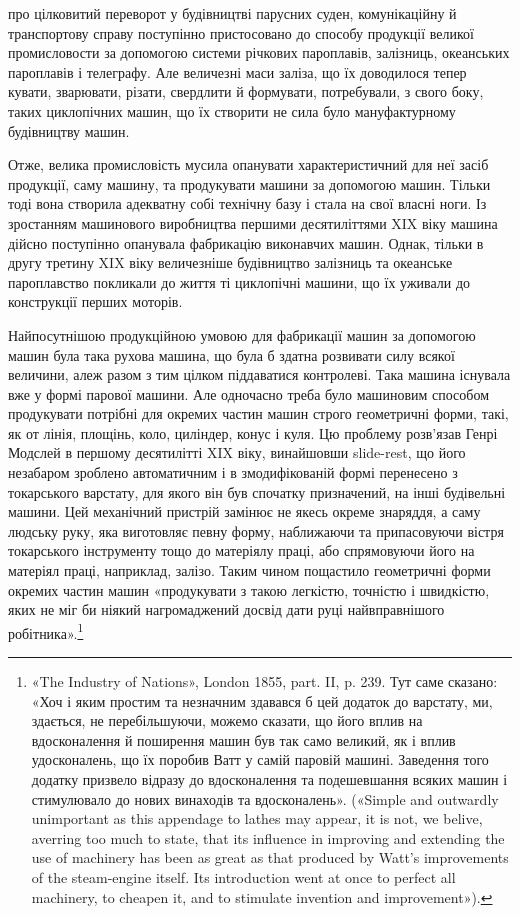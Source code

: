 про цілковитий переворот у будівництві парусних суден, комунікаційну
й транспортову справу поступінно пристосовано до способу
продукції великої промисловости за допомогою системи річкових
пароплавів, залізниць, океанських пароплавів і телеграфу.
Але величезні маси заліза, що їх доводилося тепер кувати, зварювати,
різати, свердлити й формувати, потребували, з свого боку,
таких циклопічних машин, що їх створити не сила було мануфактурному
будівництву машин.

Отже, велика промисловість мусила опанувати характеристичний
для неї засіб продукції, саму машину, та продукувати машини
за допомогою машин. Тільки тоді вона створила адекватну собі
технічну базу і стала на свої власні ноги. Із зростанням машинового
виробництва першими десятиліттями XIX віку машина дійсно
поступінно опанувала фабрикацію виконавчих машин. Однак,
тільки в другу третину XIX віку величезніше будівництво
залізниць та океанське пароплавство покликали до життя ті
циклопічні машини, що їх уживали до конструкції перших
моторів.

Найпосутнішою продукційною умовою для фабрикації машин
за допомогою машин була така рухова машина, що була б здатна
розвивати силу всякої величини, алеж разом з тим цілком піддаватися
контролеві. Така машина існувала вже у формі парової
машини. Але одночасно треба було машиновим способом продукувати
потрібні для окремих частин машин строго геометричні
форми, такі, як от лінія, площінь, коло, циліндер, конус і куля.
Цю проблему розв’язав Генрі Модслей в першому десятилітті
XIX віку, винайшовши slide-rest, що його незабаром зроблено
автоматичним і в змодифікованій формі перенесено з токарського
варстату, для якого він був спочатку призначений, на інші будівельні
машини. Цей механічний пристрій замінює не якесь окреме
знаряддя, а саму людську руку, яка виготовляє певну форму, наближаючи
та припасовуючи вістря токарського інструменту тощо
до матеріялу праці, або спрямовуючи його на матеріял праці,
наприклад, залізо. Таким чином пощастило геометричні форми
окремих частин машин «продукувати з такою легкістю, точністю
і швидкістю, яких не міг би ніякий нагромаджений досвід дати
руці найвправнішого робітника».\footnote{
«The Industry of Nations», London 1855, part. II, p. 239. Тут
саме сказано: «Хоч і яким простим та незначним здавався б цей додаток
до варстату, ми, здається, не перебільшуючи, можемо сказати, що його
вплив на вдосконалення й поширення машин був так само великий, як і
вплив удосконалень, що їх поробив Ватт у самій паровій машині. Заведення
того додатку призвело відразу до вдосконалення та подешевшання
всяких машин і стимулювало до нових винаходів та вдосконалень».
(«Simple and outwardly unimportant as this appendage to lathes may appear,
it is not, we belive, averring too much to state, that its influence in
improving and extending the use of machinery has been as great as that
produced by Watt’s improvements of the steam-engine itself. Its introduction
went at once to perfect all machinery, to cheapen it, and to stimulate
invention and improvement»).
}